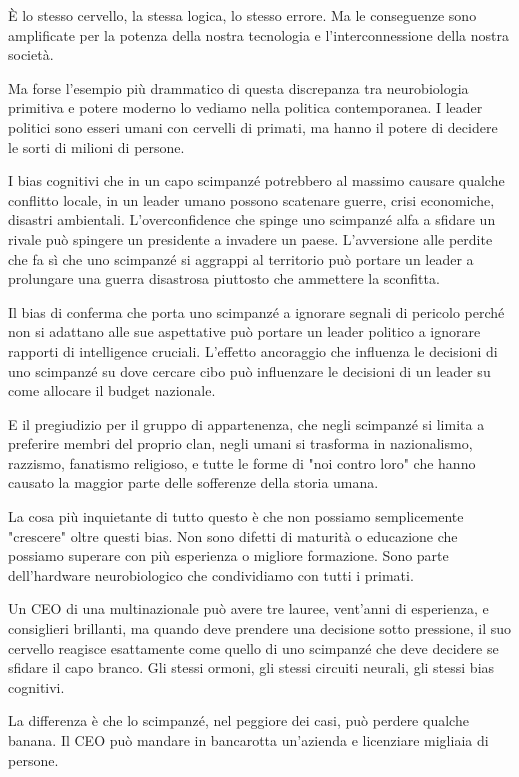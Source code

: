 È lo stesso cervello, la stessa logica, lo stesso errore. Ma le conseguenze sono amplificate per la potenza della nostra tecnologia e l'interconnessione della nostra società.

\bigskip

Ma forse l'esempio più drammatico di questa discrepanza tra neurobiologia primitiva e potere moderno lo vediamo nella politica contemporanea. I leader politici sono esseri umani con cervelli di primati, ma hanno il potere di decidere le sorti di milioni di persone.

I bias cognitivi che in un capo scimpanzé potrebbero al massimo causare qualche conflitto locale, in un leader umano possono scatenare guerre, crisi economiche, disastri ambientali. L'overconfidence che spinge uno scimpanzé alfa a sfidare un rivale può spingere un presidente a invadere un paese. L'avversione alle perdite che fa sì che uno scimpanzé si aggrappi al territorio può portare un leader a prolungare una guerra disastrosa piuttosto che ammettere la sconfitta.

Il bias di conferma che porta uno scimpanzé a ignorare segnali di pericolo perché non si adattano alle sue aspettative può portare un leader politico a ignorare rapporti di intelligence cruciali. L'effetto ancoraggio che influenza le decisioni di uno scimpanzé su dove cercare cibo può influenzare le decisioni di un leader su come allocare il budget nazionale.

E il pregiudizio per il gruppo di appartenenza, che negli scimpanzé si limita a preferire membri del proprio clan, negli umani si trasforma in nazionalismo, razzismo, fanatismo religioso, e tutte le forme di "noi contro loro" che hanno causato la maggior parte delle sofferenze della storia umana.

\medskip

La cosa più inquietante di tutto questo è che non possiamo semplicemente "crescere" oltre questi bias. Non sono difetti di maturità o educazione che possiamo superare con più esperienza o migliore formazione. Sono parte dell'hardware neurobiologico che condividiamo con tutti i primati.

Un CEO di una multinazionale può avere tre lauree, vent'anni di esperienza, e consiglieri brillanti, ma quando deve prendere una decisione sotto pressione, il suo cervello reagisce esattamente come quello di uno scimpanzé che deve decidere se sfidare il capo branco. Gli stessi ormoni, gli stessi circuiti neurali, gli stessi bias cognitivi.

La differenza è che lo scimpanzé, nel peggiore dei casi, può perdere qualche banana. Il CEO può mandare in bancarotta un'azienda e licenziare migliaia di persone.

